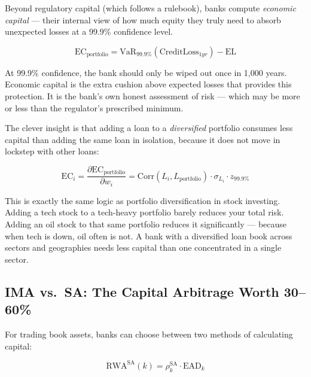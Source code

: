 \documentclass[12pt,a4paper]{article}
\begin{document}
Beyond regulatory capital (which follows a rulebook), banks compute
\emph{economic capital} --- their internal view of how much equity they truly
need to absorb unexpected losses at a 99.9\% confidence level.

\begin{equation}
  \text{EC}_{\text{portfolio}} = \text{VaR}_{99.9\%}(\text{CreditLoss}_{1yr}) - \text{EL}
\end{equation}

\begin{mdframed}[style=plainenglish]
At 99.9\% confidence, the bank should only be wiped out once in 1,000 years.
Economic capital is the extra cushion above expected losses that provides this
protection.  It is the bank's own honest assessment of risk --- which may be
more or less than the regulator's prescribed minimum.
\end{mdframed}

The clever insight is that adding a loan to a \emph{diversified} portfolio
consumes less capital than adding the same loan in isolation, because it does
not move in lockstep with other loans:

\begin{equation}
  \text{EC}_i = \frac{\partial \text{EC}_{\text{portfolio}}}{\partial w_i}
              = \text{Corr}(L_i, L_{\text{portfolio}}) \cdot \sigma_{L_i} \cdot z_{99.9\%}
\end{equation}

\begin{mdframed}[style=analogy]
This is exactly the same logic as portfolio diversification in stock investing.
Adding a tech stock to a tech-heavy portfolio barely reduces your total risk.
Adding an oil stock to that same portfolio reduces it significantly --- because
when tech is down, oil often is not.  A bank with a diversified loan book
across sectors and geographies needs less capital than one concentrated in
a single sector.
\end{mdframed}

\subsection{IMA vs.\ SA: The Capital Arbitrage Worth 30--60\%}

For trading book assets, banks can choose between two methods of calculating
capital:

\begin{equation}
  \text{RWA}^{\text{SA}}(k) = \rho_k^{\text{SA}} \cdot \text{EAD}_k
\end{equation}
\end{document}
